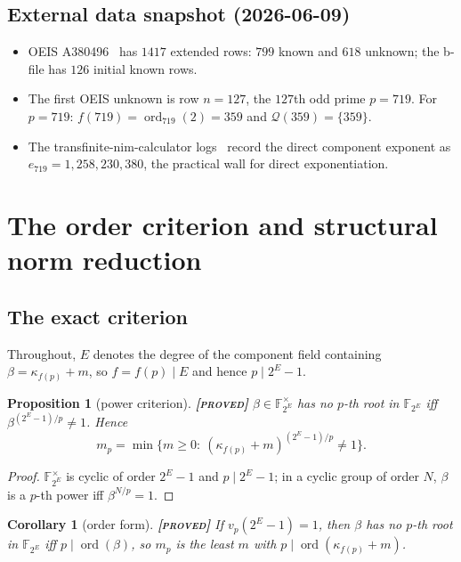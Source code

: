 \documentclass[11pt]{article}
\theoremstyle{plain}
\newtheorem{proposition}{Proposition}
\newtheorem{corollary}{Corollary}
\theoremstyle{definition}
\newcommand{\F}{\mathbb{F}}
\newcommand{\ord}{\operatorname{ord}}
\newcommand{\Qset}{\mathcal{Q}}
\newcommand{\PROVED}{\textbf{[\textsc{proved}]}}
\begin{document}
\subsection{External data snapshot (2026-06-09)}

\begin{itemize}[leftmargin=*,itemsep=0pt]
\item OEIS A380496~\cite{OEIS} has $1417$ extended rows: $799$ known and
$618$ unknown; the b-file has $126$ initial known rows.
\item The first OEIS unknown is row $n=127$, the $127$th odd prime
$p=719$. For $p=719$: $f(719)=\ord_{719}(2)=359$ and
$\Qset(359)=\{359\}$.
\item The transfinite-nim-calculator logs~\cite{Peeters} record the direct
component exponent as $e_{719}=1{,}258{,}230{,}380$, the practical wall
for direct exponentiation.
\end{itemize}

\section{The order criterion and structural norm reduction}
\label{sec:norm}

\subsection{The exact criterion}

Throughout, $E$ denotes the degree of the component field containing
$\beta=\kappa_{f(p)}+m$, so $f=f(p)\mid E$ and hence
$p\mid 2^{E}-1$.

\begin{proposition}[power criterion]\label{prop:power}
\PROVED{} $\beta\in\F_{2^E}^{\times}$ has no $p$-th root in $\F_{2^E}$
iff $\beta^{(2^E-1)/p}\neq1$. Hence
\[
  m_p=\min\bigl\{m\geq0:\ (\kappa_{f(p)}+m)^{(2^E-1)/p}\neq1\bigr\}.
\]
\end{proposition}

\begin{proof}
$\F_{2^E}^{\times}$ is cyclic of order $2^E-1$ and $p\mid 2^E-1$; in a
cyclic group of order $N$, $\beta$ is a $p$-th power iff
$\beta^{N/p}=1$.
\end{proof}

\begin{corollary}[order form]\label{cor:order}
\PROVED{} If $v_p(2^E-1)=1$, then $\beta$ has no $p$-th root in
$\F_{2^E}$ iff $p\mid\ord(\beta)$, so
$m_p$ is the least $m$ with $p\mid\ord(\kappa_{f(p)}+m)$.
\end{corollary}
\end{document}

